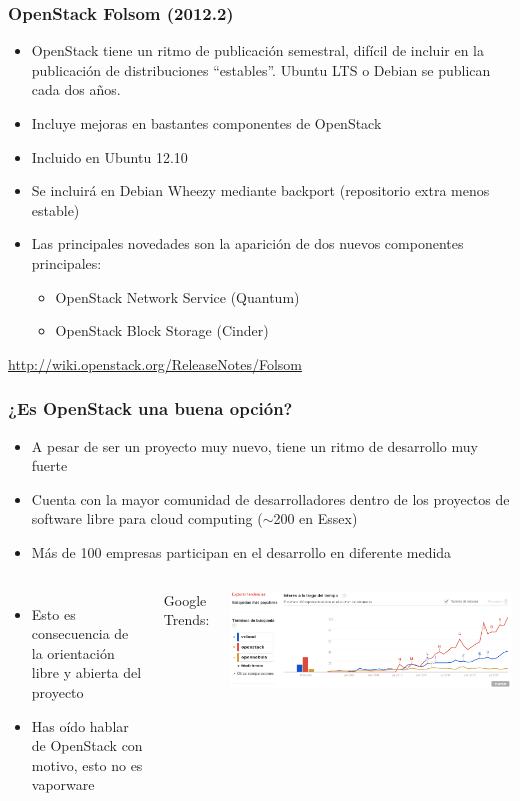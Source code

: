 \documentclass{beamer}
\begin{document}
\begin{frame}
  \frametitle{OpenStack Folsom (2012.2)}
  \begin{itemize}
  \item OpenStack tiene un ritmo de publicación semestral, difícil de incluir en
    la publicación de distribuciones ``estables''. Ubuntu LTS o Debian se
    publican cada dos años.
  \item Incluye mejoras en bastantes componentes de OpenStack
  \item Incluido en Ubuntu 12.10
  \item Se incluirá en Debian Wheezy mediante backport (repositorio extra menos
    estable)
  \item Las principales novedades son la aparición de dos nuevos componentes
    principales:
    \begin{itemize}
    \item OpenStack Network Service (Quantum)
    \item OpenStack Block Storage (Cinder)
    \end{itemize}
  \end{itemize}
  \url{http://wiki.openstack.org/ReleaseNotes/Folsom}
\end{frame}

\begin{frame}
  \frametitle{¿Es OpenStack una buena opción?}
  \begin{itemize}
  \item A pesar de ser un proyecto muy nuevo, tiene un ritmo de desarrollo muy
    fuerte
  \item Cuenta con la mayor comunidad de desarrolladores dentro de los proyectos
    de software libre para cloud computing ($\sim$200 en Essex)
  \item Más de 100 empresas participan en el desarrollo en diferente medida
  \end{itemize}  
  \begin{columns}
    \hspace{.01cm}
    \begin{itemize}
    \item Esto es consecuencia de la orientación libre y abierta del proyecto
    \item Has oído hablar de OpenStack con motivo, esto no es vaporware
    \end{itemize}
    Google Trends:
    \begin{center}
      \includegraphics[width=\textwidth]{../img/google_trends.png}
    \end{center}
  \end{columns}
\end{frame}
\end{document}
